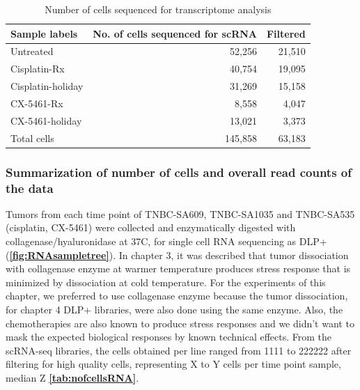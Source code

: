 \begin{table}[htbp]
 \centering
  \caption{Number of cells sequenced for transcriptome analysis}
{
\begin{tabular}{|l|r|r|}
\hline
Sample labels     & No. of cells sequenced for scRNA & Filtered \\
\hline
Untreated         & 52,256                           & 21,510    \\
Cisplatin-Rx      & 40,754                           & 19,095    \\
Cisplatin-holiday & 31,269                           & 15,158    \\
CX-5461-Rx        & 8,558                            & 4,047     \\
CX-5461-holiday   & 13,021                           & 3,373  \\  
\hline
Total cells          & 145,858                          & 63,183\\
\hline
\end{tabular}%
\label{tab:nofcellsRNA}
}
\end{table}

 
\subsubsection{Summarization of number of cells and overall read counts of the data}
Tumors from each time point of TNBC-SA609, TNBC-SA1035 and TNBC-SA535 (cisplatin, CX-5461) were collected and enzymatically digested with collagenase/hyaluronidase at 37\textdegree C, for single cell RNA sequencing as DLP+ (\textbf{\autoref{fig:RNAsampletree}}). In chapter 3, it was described that tumor dissociation with collagenase enzyme at warmer temperature produces stress response that is minimized
by dissociation at cold temperature. For the experiments of this chapter, we preferred to use collagenase enzyme because the tumor dissociation, for chapter 4 DLP+ libraries, were also done using the same enzyme. Also, the chemotherapies are also known to produce stress responses and we didn't want to mask the expected biological responses by known technical effects. 
From the scRNA-seq libraries, the cells obtained per line ranged from 1111 to 222222 after filtering for high quality cells, representing X to Y cells per time point sample, median Z \textbf{\autoref{tab:nofcellsRNA}}. 


